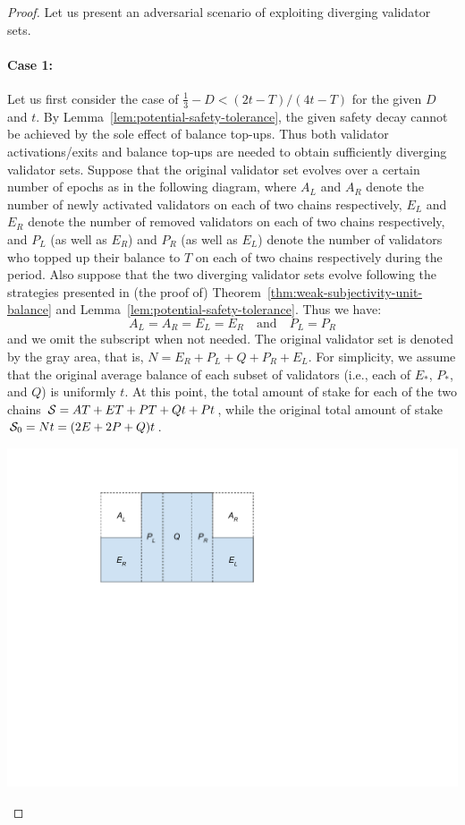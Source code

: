 \begin{proof}
Let us present an adversarial scenario of exploiting diverging validator sets.

\paragraph{Case 1:}

Let us first consider the case of $\frac{1}{3} - D < (2t - T)/(4t - T)$ for the given $D$ and $t$.
By Lemma~\ref{lem:potential-safety-tolerance}, the given safety decay cannot be achieved by the sole effect of balance top-ups.
Thus both validator activations/exits and balance top-ups are needed to obtain sufficiently diverging validator sets.
Suppose that the original validator set evolves over a certain number of epochs as in the following diagram, where $A_L$ and $A_R$ denote the number of newly activated validators on each of two chains respectively, $E_L$ and $E_R$ denote the number of removed validators on each of two chains respectively, and $P_L$ (as well as $E_R$) and $P_R$ (as well as $E_L$) denote the number of validators who topped up their balance to $T$ on each of two chains respectively during the period.
Also suppose that the two diverging validator sets evolve following the strategies presented in (the proof of) Theorem~\ref{thm:weak-subjectivity-unit-balance} and Lemma~\ref{lem:potential-safety-tolerance}.
Thus we have:
\begin{equation}\label{eq:a=e}
A_L = A_R = E_L = E_R \quad \text{and} \quad P_L = P_R
\end{equation}
and we omit the subscript when not needed.
The original validator set is denoted by the gray area, that is, $N = E_R + P_L + Q + P_R + E_L$.
For simplicity, we assume that the original average balance of each subset of validators (i.e., each of $E_*$, $P_*$, and $Q$) is uniformly $t$.
At this point, the total amount of stake for each of the two chains $\mathcal{S} = AT + ET + PT + Qt + Pt$, while the original total amount of stake $\mathcal{S}_0 = Nt = (2E + 2P + Q)t$.
\begin{center}
\includegraphics[width=.5\columnwidth]{after-n-epoch-balance-top-ups.pdf}

\end{center}
\end{proof}

